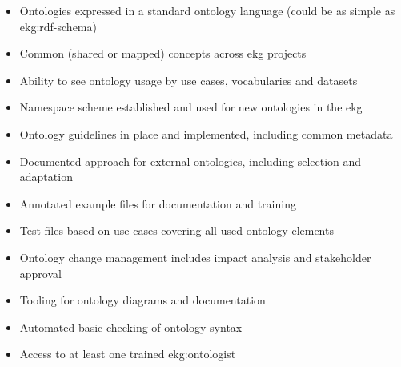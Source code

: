 \ekgmmscoringlevelTwo

\begin{itemize}
    \item Ontologies expressed in a standard ontology language (could be as simple as \gls{ekg:rdf-schema})
    \item Common (shared or mapped) concepts across \gls{ekg} projects
    \item Ability to see ontology usage by use cases, vocabularies and datasets
    \item Namespace scheme established and used for new ontologies in the \gls{ekg}
    \item Ontology guidelines in place and implemented, including common metadata
    \item Documented approach for external ontologies, including selection and adaptation
    \item Annotated example files for documentation and training
    \item Test files based on use cases covering all used ontology elements
    \item Ontology change management includes impact analysis and stakeholder approval
    \item Tooling for ontology diagrams and documentation
    \item Automated basic checking of ontology syntax
    \item Access to at least one trained \gls{ekg:ontologist}
\end{itemize}


